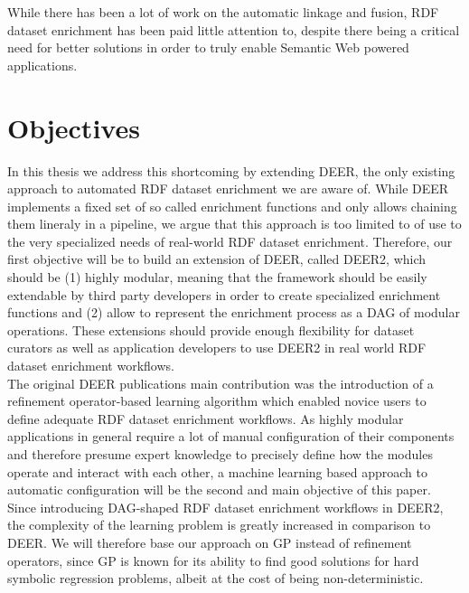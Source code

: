 While there has been a lot of work on the automatic linkage and fusion, \ac{RDF} dataset enrichment has been paid little attention to, despite there being a critical need for better solutions in order to truly enable  Semantic Web powered applications.

\section{Objectives}
\label{sec:objectives}
In this thesis we address this shortcoming by extending \ac{DEER}\cite{sherif:2015a}, the only existing approach to automated \ac{RDF} dataset enrichment we are aware of.
While DEER implements a fixed set of so called enrichment functions and only allows chaining them lineraly in a pipeline, we argue that this approach is too limited to of use to the very specialized needs of real-world \ac{RDF} dataset enrichment.
Therefore, our first objective will be to build an extension of \ac{DEER}, called \ac{DEER2}, which should be (1) highly modular, meaning that the framework should be easily extendable by third party developers in order to create specialized enrichment functions and (2) allow to represent the enrichment process as a \ac{DAG} of modular operations.
These extensions should provide enough flexibility for dataset curators as well as application developers to use \ac{DEER2} in real world \ac{RDF} dataset enrichment workflows.\\

The original \ac{DEER} publications main contribution was the introduction of a refinement operator-based learning algorithm which enabled novice users to define adequate \ac{RDF} dataset enrichment workflows.
As highly modular applications in general require a lot of manual configuration of their components and therefore presume expert knowledge to precisely define how the modules operate and interact with each other, a machine learning based approach to automatic configuration will be the second and main objective of this paper.\\

Since introducing \ac{DAG}-shaped \ac{RDF} dataset enrichment workflows in \ac{DEER2}, the complexity of the learning problem is greatly increased in comparison to \ac{DEER}.
We will therefore base our approach on \ac{GP} instead of refinement operators, since \ac{GP} is known for its ability to find good solutions for hard symbolic regression problems, albeit at the cost of being non-deterministic.


